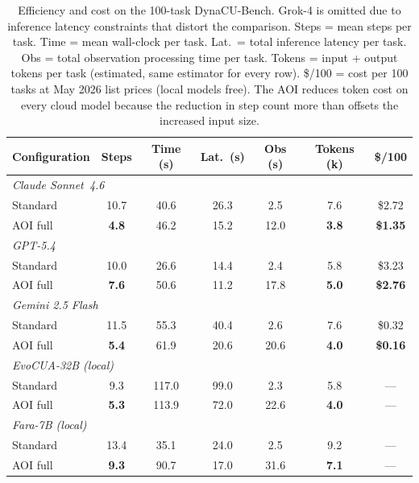\documentclass[11pt]{article}
\begin{document}
\begin{table}[!h]
\centering
\caption{Efficiency and cost on the 100-task DynaCU-Bench. Grok-4 is omitted due to inference latency constraints that distort the comparison.
Steps = mean steps per task. Time = mean wall-clock per task. Lat.\ = total inference
latency per task. Obs = total observation processing time per task. Tokens = input + output tokens per task
(estimated, same estimator for every row). \$/100 = cost per 100 tasks at May 2026 list prices
(local models free).
The AOI reduces token cost on every cloud model because the reduction in step count more than offsets
the increased input size.}
\label{tab:efficiency}
\small
\setlength{\tabcolsep}{4.0pt}
\begin{tabular}{@{}l cc cc cc@{}}
\toprule
\textbf{Configuration} & \textbf{Steps} & \textbf{Time (s)} & \textbf{Lat.\ (s)} & \textbf{Obs (s)} & \textbf{Tokens (k)} & \textbf{\$/100} \\
\midrule
\multicolumn{7}{l}{\emph{Claude Sonnet~4.6}} \\
\quad Standard & 10.7 & 40.6 & 26.3 & 2.5 & 7.6 & \$2.72 \\
\quad AOI full & \textbf{4.8} & 46.2 & 15.2 & 12.0 & \textbf{3.8} & \textbf{\$1.35} \\
\midrule
\multicolumn{7}{l}{\emph{GPT-5.4}} \\
\quad Standard & 10.0 & 26.6 & 14.4 & 2.4 & 5.8 & \$3.23 \\
\quad AOI full & \textbf{7.6} & 50.6 & 11.2 & 17.8 & \textbf{5.0} & \textbf{\$2.76} \\
\midrule
\multicolumn{7}{l}{\emph{Gemini 2.5 Flash}} \\
\quad Standard & 11.5 & 55.3 & 40.4 & 2.6 & 7.6 & \$0.32 \\
\quad AOI full & \textbf{5.4} & 61.9 & 20.6 & 20.6 & \textbf{4.0} & \textbf{\$0.16} \\
\midrule
\multicolumn{7}{l}{\emph{EvoCUA-32B (local)}} \\
\quad Standard & 9.3 & 117.0 & 99.0 & 2.3 & 5.8 & --- \\
\quad AOI full & \textbf{5.3} & 113.9 & 72.0 & 22.6 & \textbf{4.0} & --- \\
\midrule
\multicolumn{7}{l}{\emph{Fara-7B (local)}} \\
\quad Standard & 13.4 & 35.1 & 24.0 & 2.5 & 9.2 & --- \\
\quad AOI full & \textbf{9.3} & 90.7 & 17.0 & 31.6 & \textbf{7.1} & --- \\
\bottomrule
\end{tabular}
\end{table}
\end{document}
